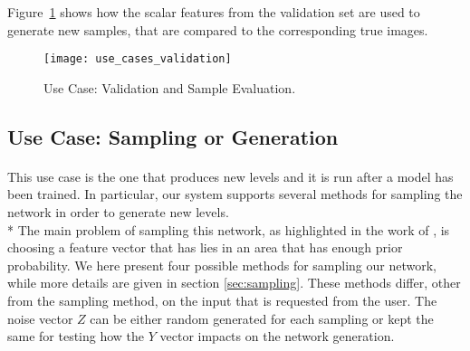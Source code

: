  Figure~\ref{fig:usecase_valid} shows how the scalar features from the validation set are used to generate new samples, that are compared to the corresponding true images.

\begin{figure}[h!]
	\begin{center}
		\texttt{[image: use\_cases\_validation]}
	\end{center}
	
	\captionsetup{width=\linewidth}
	\caption[Use Case: Validation and Sample Evaluation]{Use Case: Validation and Sample Evaluation.}
	\label{fig:usecase_valid}
\end{figure}

\subsection{Use Case: Sampling or Generation}
\label{sec:usecase_sampling}
\paragraph{} This use case is the one that produces new levels and it is run after a model has been trained. In particular, our system supports several methods for sampling the network in order to generate new levels. \\*
The main problem of sampling this network, as highlighted in the work of \citeauthor{slerp}\cite{slerp}, is choosing a feature vector that has lies in an area that has enough prior probability. We here present four possible methods for sampling our network, while more details are given in section \ref{sec:sampling}. These methods differ, other from the sampling method, on the input that is requested from the user. The noise vector $Z$ can be either random generated for each sampling or kept the same for testing how the $Y$ vector impacts on the network generation.

